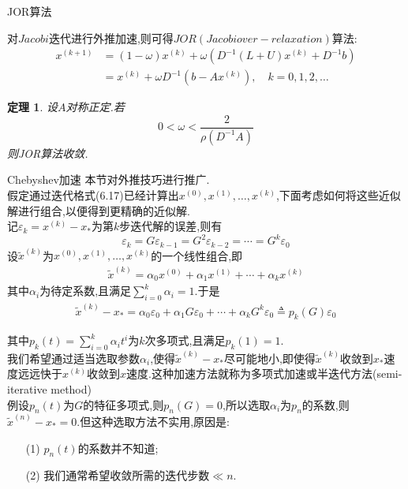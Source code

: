 \documentclass[notheorems,serif]{beamer}
\renewcommand{\normalsize}{\wuhao}
\newcommand{\wuhao}{\fontsize{10.5pt}{\baselineskip}\selectfont}
\newcommand{\hei}[1]{{\HEI#1}}
\newtheorem{theorem}{\hei{定理}}
\begin{document}
\begin{frame}


{\color{blue}\Large JOR算法}

\quad

\normalsize
对$Jacobi$迭代进行外推加速,则可得$JOR (Jacobi over-relaxation)$算法:
$$
\begin{aligned} x^{(k+1)} &=(1-\omega) x^{(k)}+\omega\left(D^{-1}(L+U) x^{(k)}+D^{-1} b\right) \\ &=x^{(k)}+\omega D^{-1}\left(b-A x^{(k)}\right), \quad k=0,1,2, \ldots \end{aligned}
$$
\begin{theorem}
设$A$对称正定.若
$$
0<\omega<\frac{2}{\rho\left(D^{-1} A\right)}
$$
则JOR算法收敛.
\end{theorem}

\end{frame}

\begin{frame}
{Chebyshev加速}
本节对外推技巧进行推广.\\
假定通过迭代格式(6.17)已经计算出$x^{(0)}, x^{(1)}, \ldots, x^{(k)}$,下面考虑如何将这些近似解进行组合,以便得到更精确的近似解.\\
记$\varepsilon_{k}=x^{(k)}-x_{*}$为第$k$步迭代解的误差,则有
$$
\varepsilon_{k}=G \varepsilon_{k-1}=G^{2} \varepsilon_{k-2}=\cdots=G^{k} \varepsilon_{0}
$$
设$\tilde{x}^{(k)}$为$x^{(0)}, x^{(1)}, \ldots, x^{(k)}$的一个线性组合,即
\begin{align*}
\tilde{x}^{(k)}=\alpha_{0} x^{(0)}+\alpha_{1} x^{(1)}+\cdots+\alpha_{k} x^{(k)}
\tag{6.19}
\end{align*}
其中$\alpha_{i}$为待定系数,且满足$\sum_{i=0}^{k} \alpha_{i}=1$.于是
\begin{align*}
\tilde{x}^{(k)}-x_{*}=\alpha_{0} \varepsilon_{0}+\alpha_{1} G \varepsilon_{0}+\cdots+\alpha_{k} G^{k} \varepsilon_{0} \triangleq p_{k}(G) \varepsilon_{0}
\tag{6.20}
\end{align*}
\end{frame}

\begin{frame}
其中$p_{k}(t)=\sum_{i=0}^{k} \alpha_{i} t^{i}$为$k$次多项式,且满足$p_{k}(1)=1$.\\
我们希望通过适当选取参数$\alpha_i$,使得$\tilde{x}^{(k)}-x_*$尽可能地小,即使得$\tilde{x}^{(k)}$收敛到$x_*$速度远远快于$x^{(k)}$收敛到$x$速度.这种加速方法就称为{\color{blue}多项式加速}或{\color{blue}半迭代方法(semi-iterative method)}\\
{\color{blue}例}\qquad 设$p_{n}(t)$为$G$的特征多项式,则$p_{n}(G)=0$,所以选取$\alpha_i$为$p_n$的系数,则$\tilde{x}^{(n)}-x_{*}=0$.但这种选取方法不实用,原因是:
\begin{itemize}
\item[(1)]$p_{n}(t)$的系数并不知道;

\item[(2)]我们通常希望收敛所需的迭代步数$\ll n$.
\end{itemize}

\end{frame}
\end{document}
